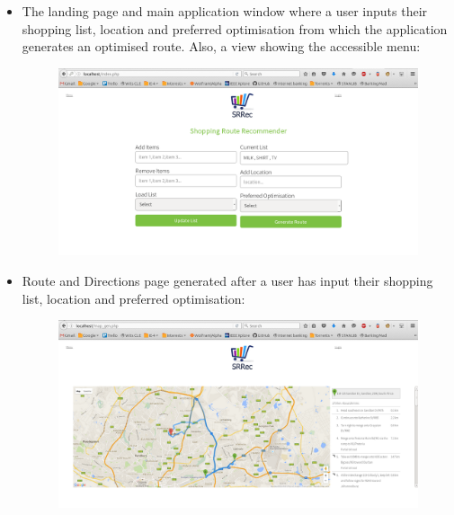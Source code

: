 \documentclass[10pt, a4paper, onecolumn]{scrartcl}
\begin{document}
\begin{itemize}
					\newpage
					\item The landing page and main application window where a user inputs their shopping list, location and preferred optimisation from which the application generates an optimised route. Also, a view showing the accessible menu:
					\begin{figure}[h!]
						\centering
						\includegraphics[width = \textwidth]{../images/index_new.png}
						\label{home page}
					\end{figure}
					
					\item Route and Directions page generated after a user has input their shopping list, location and preferred optimisation:
					\begin{figure}[h!]
						\centering
						\includegraphics[width =\textwidth]{../images/map_gen_new.png}
						\label{map page}
					\end{figure}
					

\end{itemize}
\end{document}
